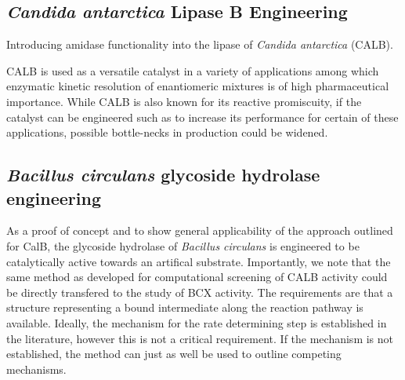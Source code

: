 \subsection{\textit{Candida antarctica} Lipase B Engineering}
Introducing amidase functionality into the lipase of \textit{Candida antarctica} (CALB).

CALB is used as a versatile catalyst in a variety of applications among which enzymatic kinetic resolution of enantiomeric mixtures is of high pharmaceutical importance\cite{gotor2006candida}.
While CALB is also known for its reactive promiscuity\cite{CBIC:CBIC200800318}, if the catalyst can be engineered such as to increase its performance for certain of these applications, possible bottle-necks in production could be widened.



\subsection{\textit{Bacillus circulans} glycoside hydrolase engineering}
As a proof of concept and to show general applicability of the approach outlined for CalB, the glycoside hydrolase of \textit{Bacillus circulans} is engineered to be catalytically active towards an artifical substrate.
Importantly, we note that the same method as developed for computational screening of CALB activity could be directly transfered to the study of BCX activity.
The requirements are that a structure representing a bound intermediate along the reaction pathway is available.
Ideally, the mechanism for the rate determining step is established in the literature, however this is not a critical requirement.
If the mechanism is not established, the method can just as well be used to outline competing mechanisms.
